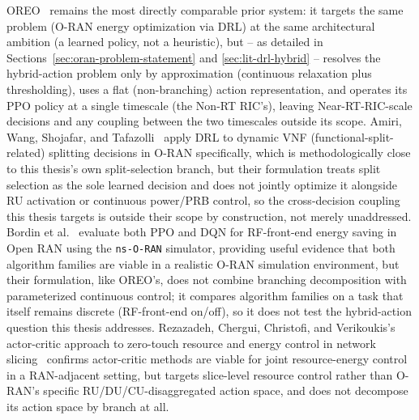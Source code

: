OREO~\cite{qazzaz2026oreo} remains the most directly comparable prior
system: it targets the same problem (O-RAN energy optimization via DRL) at
the same architectural ambition (a learned policy, not a heuristic), but --
as detailed in Sections~\ref{sec:oran-problem-statement} and
\ref{sec:lit-drl-hybrid} -- resolves the hybrid-action problem only by
approximation (continuous relaxation plus thresholding), uses a flat
(non-branching) action representation, and operates its PPO policy at a
single timescale (the Non-RT RIC's), leaving Near-RT-RIC-scale decisions and
any coupling between the two timescales outside its scope. Amiri, Wang,
Shojafar, and Tafazolli~\cite{amiri2022vnf} apply DRL to dynamic VNF
(functional-split-related) splitting decisions in O-RAN specifically, which
is methodologically close to this thesis's own split-selection branch, but
their formulation treats split selection as the sole learned decision and
does not jointly optimize it alongside RU activation or continuous power/PRB
control, so the cross-decision coupling this thesis targets is outside
their scope by construction, not merely unaddressed. Bordin et
al.~\cite{bordin2025design} evaluate both PPO and DQN for RF-front-end
energy saving in Open RAN using the \texttt{ns-O-RAN} simulator, providing
useful evidence that both algorithm families are viable in a realistic
O-RAN simulation environment, but their formulation, like OREO's, does not
combine branching decomposition with parameterized continuous control; it
compares algorithm families on a task that itself remains discrete
(RF-front-end on/off), so it does not test the hybrid-action question this
thesis addresses. Rezazadeh, Chergui, Christofi, and Verikoukis's
actor-critic approach to zero-touch resource and energy control in network
slicing~\cite{rezazadeh2022actorcritic} confirms actor-critic methods are
viable for joint resource-energy control in a RAN-adjacent setting, but
targets slice-level resource control rather than O-RAN's specific
RU/DU/CU-disaggregated action space, and does not decompose its action
space by branch at all.

